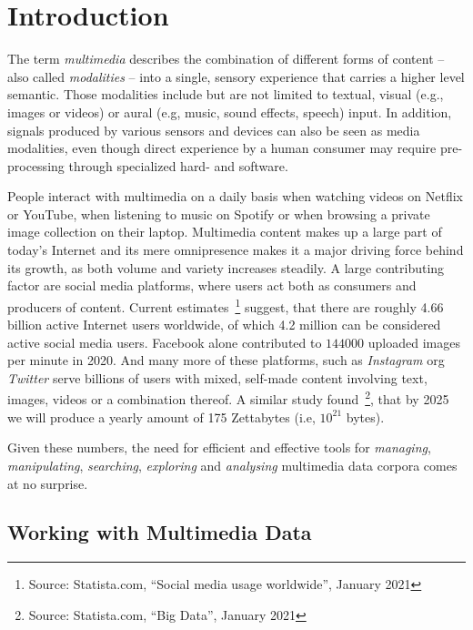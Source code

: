 \chapter{Introduction}
The term \emph{multimedia} describes the combination of different forms of content -- also called \emph{modalities} -- into a single, sensory experience that carries a higher level semantic. Those modalities include but are not limited to textual, visual (e.g., images or videos) or aural (e.g, music, sound effects, speech) input. In addition, signals produced by various sensors and devices can also be seen as media modalities, even though direct experience by a human consumer may require pre-processing through specialized hard- and software.

People interact with multimedia on a daily basis when watching videos on Netflix or YouTube, when listening to music on Spotify or when browsing a private image collection on their laptop. Multimedia content makes up a large part of today's Internet and its mere omnipresence makes it a major driving force behind its growth, as both volume and variety increases steadily. A large contributing factor are social media platforms, where users act both as consumers and producers of content. Current estimates~\footnote{Source: Statista.com, ``Social media usage worldwide'', January 2021} suggest, that there are roughly 4.66 billion active Internet users worldwide, of which 4.2 million can be considered active social media users. Facebook alone contributed to $144000$ uploaded images per minute in 2020. And many more of these  platforms, such as \emph{Instagram} org \emph{Twitter} serve billions of users with mixed, self-made content involving text, images, videos or a combination thereof. A similar study found~\footnote{Source: Statista.com, ``Big Data'', January 2021}, that by 2025 we will produce a yearly amount of 175 Zettabytes (i.e, $10^{21}$ bytes).

Given these numbers, the need for efficient and effective tools for \emph{managing}, \emph{manipulating}, \emph{searching}, \emph{exploring} and \emph{analysing} multimedia data corpora comes at no surprise.

\section{Working with Multimedia Data}


